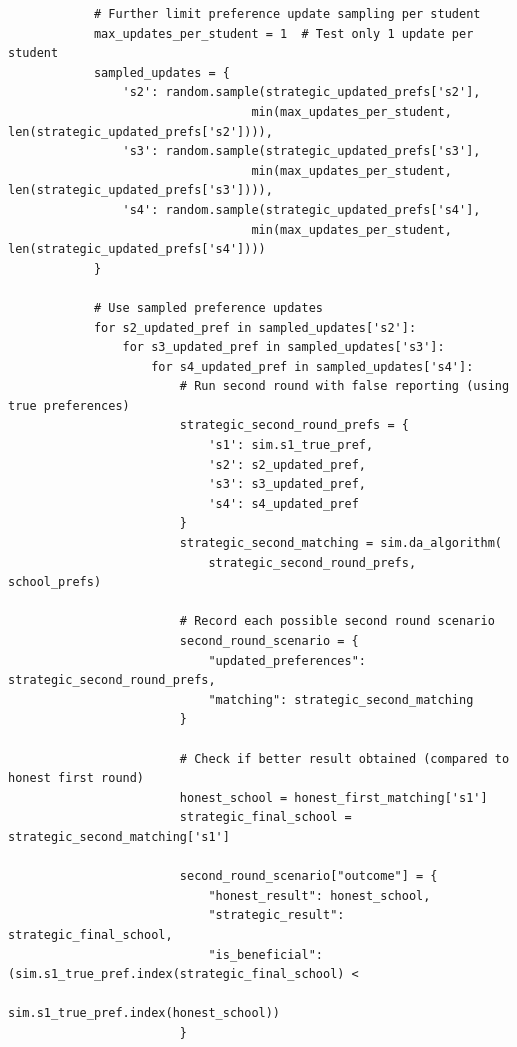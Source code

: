 \documentclass{article}
\begin{document}
\begin{verbatim}
            # Further limit preference update sampling per student
            max_updates_per_student = 1  # Test only 1 update per student
            sampled_updates = {
                's2': random.sample(strategic_updated_prefs['s2'], 
                                  min(max_updates_per_student, len(strategic_updated_prefs['s2']))),
                's3': random.sample(strategic_updated_prefs['s3'], 
                                  min(max_updates_per_student, len(strategic_updated_prefs['s3']))),
                's4': random.sample(strategic_updated_prefs['s4'], 
                                  min(max_updates_per_student, len(strategic_updated_prefs['s4'])))
            }
            
            # Use sampled preference updates
            for s2_updated_pref in sampled_updates['s2']:
                for s3_updated_pref in sampled_updates['s3']:
                    for s4_updated_pref in sampled_updates['s4']:
                        # Run second round with false reporting (using true preferences)
                        strategic_second_round_prefs = {
                            's1': sim.s1_true_pref,
                            's2': s2_updated_pref,
                            's3': s3_updated_pref,
                            's4': s4_updated_pref
                        }
                        strategic_second_matching = sim.da_algorithm(
                            strategic_second_round_prefs, school_prefs)
                        
                        # Record each possible second round scenario
                        second_round_scenario = {
                            "updated_preferences": strategic_second_round_prefs,
                            "matching": strategic_second_matching
                        }
                        
                        # Check if better result obtained (compared to honest first round)
                        honest_school = honest_first_matching['s1']
                        strategic_final_school = strategic_second_matching['s1']
                        
                        second_round_scenario["outcome"] = {
                            "honest_result": honest_school,
                            "strategic_result": strategic_final_school,
                            "is_beneficial": (sim.s1_true_pref.index(strategic_final_school) < 
                                            sim.s1_true_pref.index(honest_school))
                        }
                        

\end{verbatim}
\end{document}
